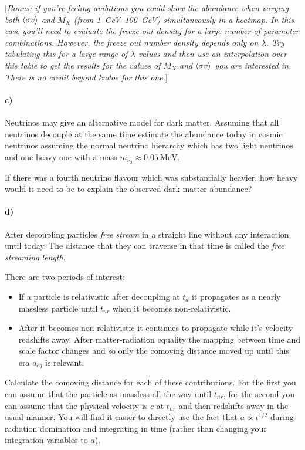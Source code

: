 \documentclass[12pt]{article}
\begin{document}
[\emph{Bonus: if you're feeling ambitious you could show the abundance when varying both $\langle \sigma v \rangle$ and $M_X$ (from \SIrange{1}{100}{\GeV}) simultaneously in a heatmap. In this case you'll need to evaluate the freeze out density for a large number of parameter combinations. However, the freeze out number density depends only on $\lambda$. Try tabulating this for a large range of $\lambda$ values and then use an interpolation over this table to get the results for the values of $M_X$ and $\langle \sigma v \rangle$ you are interested in. There is no credit beyond kudos for this one.}]

\paragraph{c)} Neutrinos may give an alternative model for dark matter. Assuming that all neutrinos decouple at the same time estimate the abundance today in cosmic neutrinos assuming the normal neutrino hierarchy which has two light neutrinos and one heavy one with a mass $m_{\nu_3} \approx \SI{0.05}{\mega\electronvolt}$.

If there was a fourth neutrino flavour which was substantially heavier, how heavy would it need to be to explain the observed dark matter abundance?

\paragraph{d)} After decoupling particles \emph{free stream} in a straight line without any interaction until today. The distance that they can traverse in that time is called the \emph{free streaming length}.

There are two periods of interest:
\begin{itemize}
    \item If a particle is relativistic after decoupling at $t_d$ it propagates as a nearly massless particle until $t_{nr}$ when it becomes non-relativistic.
    \item After it becomes non-relativistic it continues to propagate while it's velocity redshifts away. After matter-radiation equality the mapping between time and scale factor changes and so only the comoving distance moved up until this era $a_{eq}$ is relevant.
\end{itemize}
Calculate the comoving distance for each of these contributions. For the first you can assume that the particle as massless all the way until $t_{nr}$, for the second you can assume that the physical velocity is $c$ at $t_{nr}$ and then redshifts away in the usual manner. You will find it easier to directly use the fact that $a \propto t^{1/2}$ during radiation domination and integrating in time (rather than changing your integration variables to $a$).
\end{document}
